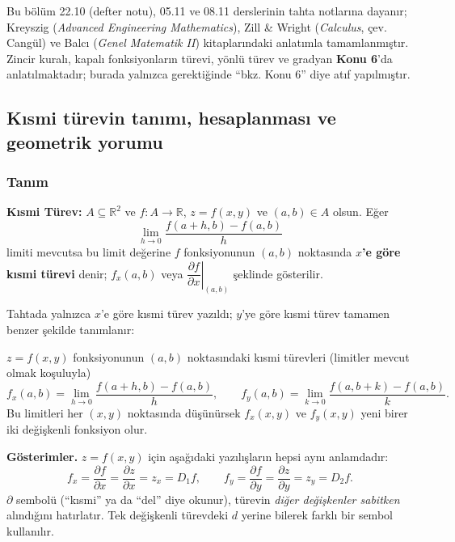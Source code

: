 \begin{bilgi}
Bu bölüm 22.10 (defter notu), 05.11 ve 08.11 derslerinin tahta notlarına dayanır; Kreyszig (\emph{Advanced Engineering
Mathematics}), Zill \& Wright (\emph{Calculus}, çev. Cangül) ve Balcı (\emph{Genel Matematik II}) kitaplarındaki
anlatımla tamamlanmıştır. Zincir kuralı, kapalı fonksiyonların türevi, yönlü türev ve gradyan \textbf{Konu 6}'da
anlatılmaktadır; burada yalnızca gerektiğinde ``bkz. Konu 6'' diye atıf yapılmıştır.
\end{bilgi}

\subsection{Kısmi türevin tanımı, hesaplanması ve geometrik yorumu}

\subsubsection{Tanım}

\begin{tahta}
\textbf{Kısmi Türev:} $A\subseteq\mathbb R^2$ ve $f:A\to\mathbb R$, $z=f(x,y)$ ve $(a,b)\in A$ olsun. Eğer
\[ \lim_{h\to0}\frac{f(a+h,b)-f(a,b)}{h} \]
limiti mevcutsa bu limit değerine $f$ fonksiyonunun $(a,b)$ noktasında \textbf{$x$'e göre kısmi türevi} denir;
$f_x(a,b)$ veya $\left.\dfrac{\partial f}{\partial x}\right|_{(a,b)}$ şeklinde gösterilir.
\end{tahta}

Tahtada yalnızca $x$'e göre kısmi türev yazıldı; $y$'ye göre kısmi türev tamamen benzer şekilde tanımlanır:

\begin{tanim}
$z=f(x,y)$ fonksiyonunun $(a,b)$ noktasındaki kısmi türevleri (limitler mevcut olmak koşuluyla)
\[
f_x(a,b)=\lim_{h\to0}\frac{f(a+h,b)-f(a,b)}{h},\qquad
f_y(a,b)=\lim_{k\to0}\frac{f(a,b+k)-f(a,b)}{k}.
\]
Bu limitleri her $(x,y)$ noktasında düşünürsek $f_x(x,y)$ ve $f_y(x,y)$ yeni birer iki değişkenli fonksiyon olur.
\end{tanim}

\textbf{Gösterimler.} $z=f(x,y)$ için aşağıdaki yazılışların hepsi aynı anlamdadır:
\[
f_x=\frac{\partial f}{\partial x}=\frac{\partial z}{\partial x}=z_x=D_1f,\qquad
f_y=\frac{\partial f}{\partial y}=\frac{\partial z}{\partial y}=z_y=D_2f .
\]
$\partial$ sembolü (``kısmi'' ya da ``del'' diye okunur), türevin \emph{diğer değişkenler sabitken} alındığını
hatırlatır. Tek değişkenli türevdeki $d$ yerine bilerek farklı bir sembol kullanılır.

